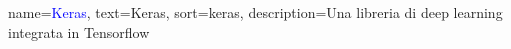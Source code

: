 


    

\newcommand*{\keyword}[1]{\textcolor{blue}{#1}} %

{
    name=\keyword{Keras},
    text=Keras,
    sort=keras,
    description={Una libreria di deep learning integrata in Tensorflow}
}